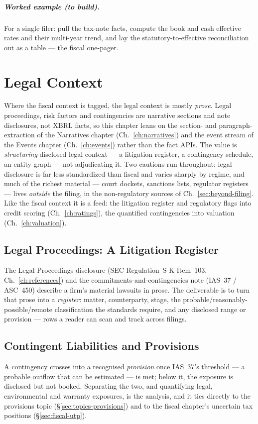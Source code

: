 \documentclass[11pt,a4paper]{report}
\begin{document}
\paragraph{Worked example (to build).} For a single filer: pull the tax-note facts, compute the book and cash
effective rates and their multi-year trend, and lay the statutory-to-effective reconciliation out as a table
--- the fiscal one-pager.

\chapter{Legal Context}
\label{ch:legal}

Where the fiscal context is tagged, the legal context is mostly \emph{prose}. Legal proceedings, risk factors
and contingencies are narrative sections and note disclosures, not XBRL facts, so this chapter leans on the
section- and paragraph-extraction of the Narratives chapter (Ch.~\ref{ch:narratives}) and the event stream of
the Events chapter (Ch.~\ref{ch:events}) rather than the fact APIs. The value is \emph{structuring} disclosed
legal context --- a litigation register, a contingency schedule, an entity graph --- not adjudicating it. Two
cautions run throughout: legal disclosure is far less standardized than fiscal and varies sharply by regime,
and much of the richest material --- court dockets, sanctions lists, regulator registers --- lives \emph{outside}
the filing, in the non-regulatory sources of Ch.~\ref{sec:beyond-filing}. Like the fiscal context it is a feed:
the litigation register and regulatory flags into credit scoring (Ch.~\ref{ch:ratings}), the quantified
contingencies into valuation (Ch.~\ref{ch:valuation}).

\section{Legal Proceedings: A Litigation Register}
\label{sec:legal-proceedings}
The Legal Proceedings disclosure (SEC Regulation~S-K Item~103, Ch.~\ref{ch:references}) and the
commitments-and-contingencies note (IAS~37 / ASC~450) describe a firm's material lawsuits in prose. The
deliverable is to turn that prose into a \emph{register}: matter, counterparty, stage, the
probable/reasonably-possible/remote classification the standards require, and any disclosed range or provision
--- rows a reader can scan and track across filings.

\section{Contingent Liabilities and Provisions}
\label{sec:legal-contingencies}
A contingency crosses into a recognised \emph{provision} once IAS~37's threshold --- a probable outflow that can
be estimated --- is met; below it, the exposure is disclosed but not booked. Separating the two, and quantifying
legal, environmental and warranty exposures, is the analysis, and it ties directly to the provisions topic
(\S\ref{sec:topics-provisions}) and to the fiscal chapter's uncertain tax positions (\S\ref{sec:fiscal-utp}).
\end{document}
